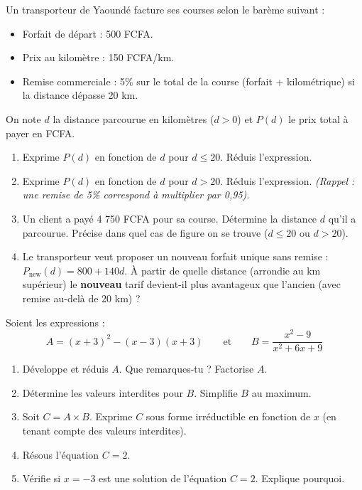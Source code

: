\documentclass[11pt]{article}
\begin{document}
\begin{exercice}
Un transporteur de Yaoundé facture ses courses selon le barème suivant :
\begin{itemize}
    \item Forfait de départ : 500 FCFA.
    \item Prix au kilomètre : 150 FCFA/km.
    \item Remise commerciale : 5\% sur le total de la course (forfait + kilométrique) si la distance dépasse 20 km.
\end{itemize}
On note $d$ la distance parcourue en kilomètres ($d > 0$) et $P(d)$ le prix total à payer en FCFA.
\begin{enumerate}
    \item Exprime $P(d)$ en fonction de $d$ pour $d \le 20$. Réduis l'expression.
    \item Exprime $P(d)$ en fonction de $d$ pour $d > 20$. Réduis l'expression. \emph{(Rappel : une remise de 5\% correspond à multiplier par 0,95).}
    \item Un client a payé 4 750 FCFA pour sa course. Détermine la distance $d$ qu'il a parcourue. Précise dans quel cas de figure on se trouve ($d \le 20$ ou $d > 20$).
    \item Le transporteur veut proposer un nouveau forfait unique sans remise : $P_{\text{new}}(d) = 800 + 140d$. À partir de quelle distance (arrondie au km supérieur) le \textbf{nouveau} tarif devient-il plus avantageux que l'ancien (avec remise au-delà de 20 km) ?
\end{enumerate}
\end{exercice}

\begin{exercice}
Soient les expressions :
\[
A = (x + 3)^2 - (x - 3)(x + 3) \qquad \text{et} \qquad B = \frac{x^2 - 9}{x^2 + 6x + 9}
\]
\begin{enumerate}
    \item Développe et réduis $A$. Que remarques-tu ? Factorise $A$.
    \item Détermine les valeurs interdites pour $B$. Simplifie $B$ au maximum.
    \item Soit $C = A \times B$. Exprime $C$ sous forme irréductible en fonction de $x$ (en tenant compte des valeurs interdites).
    \item Résous l'équation $C = 2$.
    \item Vérifie si $x = -3$ est une solution de l'équation $C = 2$. Explique pourquoi.
\end{enumerate}
\end{exercice}
\end{document}
